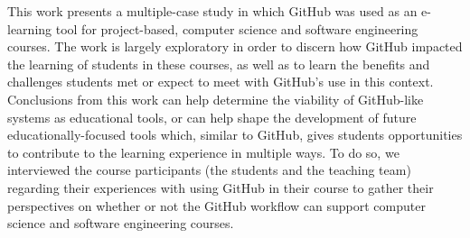


This work presents a multiple-case study in which GitHub was used as an e-learning tool for project-based, computer science and software engineering courses. The work is largely exploratory in order to discern how GitHub impacted the learning of students in these courses, as well as to learn the benefits and challenges students met or expect to meet with GitHub's use in this context. Conclusions from this work can help determine the viability of GitHub-like systems as educational tools, or can help shape the development of future educationally-focused tools which, similar to GitHub, gives students opportunities to contribute to the learning experience in multiple ways. To do so, we interviewed the course participants (the students and the teaching team) regarding their experiences with using GitHub in their course to gather their perspectives on whether or not the GitHub workflow can support computer science and software engineering courses.

